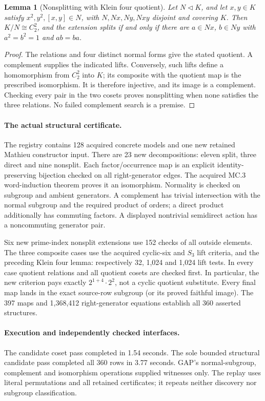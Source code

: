 \documentclass[11pt]{article}
\newtheorem{lemma}[theorem]{Lemma}
\begin{document}
\begin{lemma}[Nonsplitting with Klein four quotient]
Let $N\lhd K$, and let $x,y\in K$ satisfy
$x^2,y^2,[x,y]\in N$, with $N,Nx,Ny,Nxy$ disjoint and covering $K$.
Then $K/N\cong C_2^2$, and the extension splits if and only if there are
$a\in Nx$, $b\in Ny$ with $a^2=b^2=1$ and $ab=ba$.
\end{lemma}
\begin{proof}
The relations and four distinct normal forms give the stated quotient.
A complement supplies the indicated lifts. Conversely, such lifts define
a homomorphism from $C_2^2$ into $K$; its composite with the quotient map
is the prescribed isomorphism. It is therefore injective, and its image
is a complement. Checking every pair in the two cosets proves nonsplitting
when none satisfies the three relations. No failed complement search is
a premise.
\end{proof}

\paragraph{The actual structural certificate.}
The registry contains 128 acquired concrete models and one new retained
Mathieu constructor input. There are 23 new decompositions: eleven split,
three direct and nine nonsplit. Each factor/occurrence map is an explicit
identity-preserving bijection checked on all right-generator edges. The
acquired MC.3 word-induction theorem proves it an isomorphism. Normality
is checked on subgroup and ambient generators. A complement has trivial
intersection with the normal subgroup and the required product of orders;
a direct product additionally has commuting factors. A displayed nontrivial
semidirect action has a noncommuting generator pair.

Six new prime-index nonsplit extensions use 152 checks of all outside
elements. The three composite cases use the acquired cyclic-six and
$S_3$ lift criteria, and the preceding Klein four lemma: respectively
32, 1,024 and 1,024 lift tests. In every case quotient relations and
all quotient cosets are checked first. In particular, the new criterion
pays exactly $2^{1+4}\mathbin{\cdot}2^2$, not a cyclic quotient substitute.
Every final map lands in the exact source-row subgroup (or its proved
faithful image). The 397 maps and 1,368,412 right-generator equations
establish all 360 asserted structures.

\newpage
\paragraph{Execution and independently checked interfaces.}
The candidate coset pass completed in 1.54 seconds. The sole bounded
structural candidate pass completed all 360 rows in 3.77 seconds. GAP's
normal-subgroup, complement and isomorphism operations supplied witnesses
only. The replay uses literal permutations and all retained certificates;
it repeats neither discovery nor subgroup classification.
\end{document}
